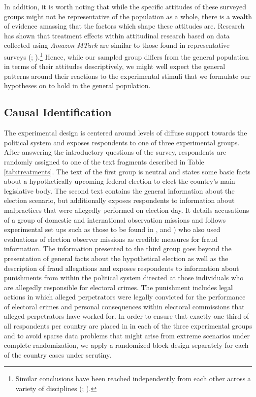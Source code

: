 \documentclass[11pt, ngerman,english,a4]{article}
\begin{document}
In addition, it is worth noting that while the specific attitudes of these surveyed groups might not be representative of the population as a whole, there is a wealth of evidence amassing that the factors which shape these attitudes are. Research has shown that treatment effects within attitudinal research based on data collected using \textit{Amazon MTurk} are similar to those found in representative surveys (\citealt{Clifford2015}; \citealt{Coppock2019}).\footnote{Similar conclusions have been reached independently from each other across a variety of disciplines (\citealt{Bartneck2015}; \citealt{Yang2015}).} Hence, while our sampled group differs from the general population in terms of their attitudes descriptively, we might well expect the general patterns around their reactions to the experimental stimuli that we formulate our hypotheses on to hold in the general population. 

\newpage

\subsection*{Causal Identification}

The experimental design is centered around levels of diffuse support towards the political system and exposes respondents to one of three experimental groups. After answering the introductory questions of the survey, respondents are randomly assigned to one of the text fragments described in Table \ref{tab:treatments}. The text of the first group is neutral and states some basic facts about a hypothetically upcoming federal election to elect the country’s main legislative body. The second text contains the general information about the election scenario, but additionally exposes respondents to information about malpractices that were allegedly performed on election day. It details accusations of a group of domestic and international observation missions and follows experimental set ups such as those to be found in \citet{Bush2018}, \citet{Williamson2020} and \citet{Robertson2017}) who also used evaluations of election observer missions as credible measures for fraud information. The information presented to the third group goes beyond the presentation of general facts about the hypothetical election as well as the description of fraud allegations and exposes respondents to information about punishments from within the political system directed at those individuals who are allegedly responsible for electoral crimes. The punishment includes legal actions in which alleged perpetrators were legally convicted for the performance of electoral crimes and personal consequences within electoral commissions that alleged perpetrators have worked for. In order to ensure that exactly one third of all respondents per country are placed in in each of the three experimental groups and to avoid sparse data problems that might arise from extreme scenarios under complete randomization, we apply a randomized block design separately for each of the country cases under scrutiny. 
\end{document}
